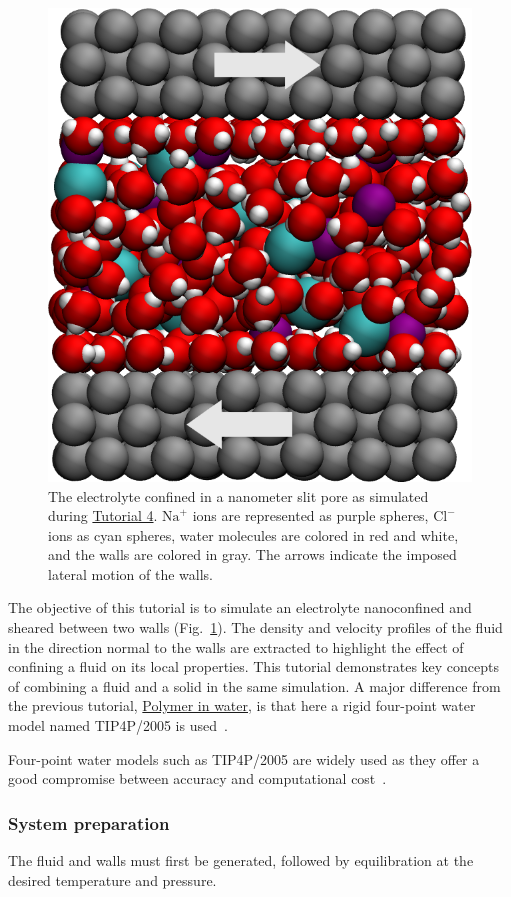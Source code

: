 \documentclass[9pt,tutorial]{livecoms}
\begin{document}
\begin{figure}
\centering
\includegraphics[width=0.55\linewidth]{NANOSHEAR}
\caption{The electrolyte confined in a nanometer slit pore as simulated during
\hyperref[sheared-confined-label]{Tutorial 4}.  $\text{Na}^+$ ions are represented
as purple spheres, $\text{Cl}^-$ ions as cyan spheres, water molecules are colored
in red and white, and the walls are colored in gray.  The arrows indicate the
imposed lateral motion of the walls.}
\label{fig:NANOSHEAR}
\end{figure}

\noindent The objective of this tutorial is to simulate an electrolyte
nanoconfined and sheared between two walls (Fig.~\ref{fig:NANOSHEAR}).  The density
and velocity profiles of the fluid in the direction normal to the walls are
extracted to highlight the effect of confining a fluid on its local properties.
This tutorial demonstrates key concepts of combining a fluid and a solid in
the same simulation.  A major difference from the previous tutorial,
\hyperref[all-atom-label]{Polymer in water}, is that here a rigid four-point
water model named TIP4P/2005 is used~\cite{abascal2005general}.

\begin{note}
Four-point water models such as TIP4P/2005 are widely used as they offer a
good compromise between accuracy and computational cost~\cite{kadaoluwa2021systematic}.
\end{note}

\subsubsection{System preparation}

The fluid and walls must first be generated, followed by equilibration at the
desired temperature and pressure.
\end{document}
